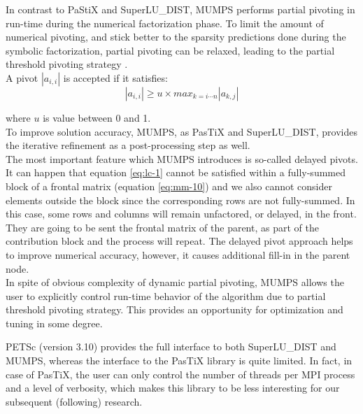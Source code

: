 In contrast to PaStiX and SuperLU\_DIST, MUMPS performs partial pivoting in run-time during the numerical factorization phase. To limit the amount of numerical pivoting, and stick better to the
sparsity predictions done during the symbolic factorization, partial pivoting can be relaxed, leading to the partial threshold pivoting strategy \cite{mumps-manual}.\\

A pivot $|a_{i,i}|$ is accepted if it satisfies:\\
\begin{equation}\label{eq:lc-1}
|a_{i,i}| \geq u \times max_{k=i \cdots n} |a_{k,j}|
\end{equation}

where $u$ is value between 0 and 1.\\

To improve solution accuracy, MUMPS, as PasTiX and SuperLU\_DIST, provides the iterative refinement as a post-processing step as well.\\


The most important feature which MUMPS introduces is so-called delayed pivots. It can happen that equation \ref{eq:lc-1} cannot be satisfied within a fully-summed block of a frontal matrix (equation  \ref{eq:mm-10}) and we also cannot consider elements outside the block since the corresponding rows are not fully-summed. In this case, some rows and columns will remain unfactored, or delayed, in the front. They are going to be sent the frontal matrix of the parent, as part of the contribution block and the process will repeat. The delayed pivot approach helps to improve numerical accuracy, however, it causes additional fill-in in the parent node.\\


In spite of obvious complexity of dynamic partial pivoting, MUMPS allows the user to explicitly control run-time behavior of the algorithm due to partial threshold pivoting strategy. This provides an opportunity for optimization and tuning in some degree.\\



PETSc (version 3.10) provides the full interface to both SuperLU\_DIST and MUMPS, whereas the interface to the PasTiX library is quite limited. In fact, in case of PasTiX, the user can only control the number of threads per MPI process and a level of verbosity, which makes this library to be less interesting for our subsequent (following) research.\\


